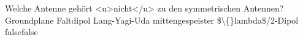     {Welche Antenne gehört <u>nicht</u> zu den symmetrischen Antennen?}
    {Groundplane}
    {Faltdipol}
    {Lang-Yagi-Uda}
    {mittengespeister \$\textbackslash\{\}lambda\$/2-Dipol}
    {false}{false}